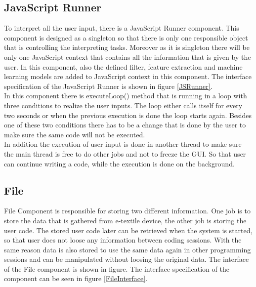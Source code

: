 \subsection{JavaScript Runner}
To interpret all the user input, there is a JavaScript Runner component. This component is designed as a singleton so that there is only one responsible object that is controlling the interpreting tasks. Moreover as it is singleton there will be only one JavaScript context that contains all the information that is given by the user. In this component, also the defined filter, feature extraction and machine learning models are added to JavaScript context in this component. The interface specification of the JavaScript Runner is shown in figure \ref{JSRunner}.\\

In this component there is executeLoop() method that is running in a loop with three conditions to realize the user inputs. The loop either calls itself for every two seconds or when the previous execution is done the loop starts again. Besides one of these two conditions there has to be a change that is done by the user to make sure the same code will not be executed. \\

In addition the execution of user input is done in another thread to make sure the main thread is free to do other jobs and not to freeze the GUI. So that user can continue writing a code, while the execution is done on the background. \\


\subsection{File}
File Component is responsible for storing two different information. One job is to store the data that is gathered from e-textile device, the other job is storing the user code. The stored user code later can be retrieved when the system is started, so that user does not loose any information between coding sessions. With the same reason data is also stored to use the same data again in other programming sessions and can be manipulated without loosing the original data. The interface of the File component is shown in figure. The interface specification of the component can be seen in figure \ref{FileInterface}.\\


